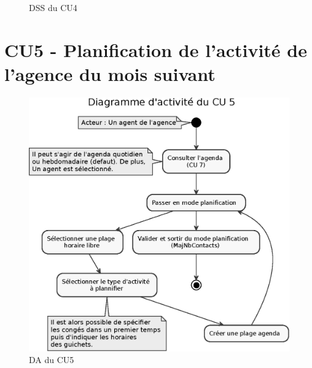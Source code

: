 \begin{figure}[H]
\noindent{}
\caption{DSS du CU4}
\end{figure}




\section{CU5 - Planification de l’activité de l’agence du mois suivant}

\begin{figure}[H]
\centering
\includegraphics[width=\textwidth]{figures/eps/DA_CU5.eps}
\caption{DA du CU5}
\end{figure}

